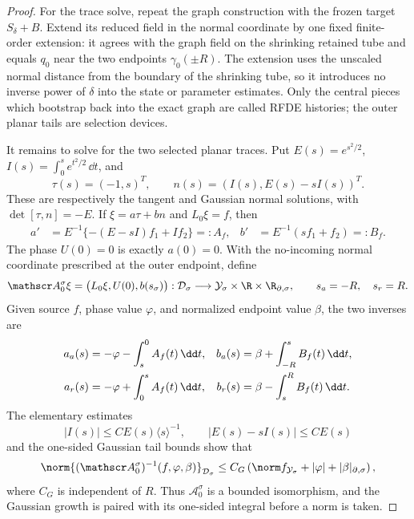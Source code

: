 \begin{proof}
For the trace solve, repeat the graph construction with the frozen target
\(S_\delta+B\).  Extend its reduced field in the normal coordinate by one
fixed finite-order extension: it agrees with the graph field on the
shrinking retained tube and equals \(q_0\) near the two endpoints
\(\gamma_0(\pm R)\).  The extension uses the unscaled normal distance from
the boundary of the shrinking tube, so it introduces no inverse power of
\(\delta\) into the state or parameter estimates.  Only the central pieces
which bootstrap back into the exact graph are called RFDE histories; the
outer planar tails are selection devices.

It remains to solve for the two selected planar traces.  Put \(E(s)=e^{s^2/2}\),
\(I(s)=\int_0^se^{t^2/2}\,\dd t\), and
\[
 \tau(s)=(-1,s)^T,
 \qquad n(s)=(I(s),E(s)-sI(s))^T.
\]
These are respectively the tangent and Gaussian normal solutions, with
\(\det[\tau,n]=-E\).  If \(\xi=a\tau+bn\) and \(L_0\xi=f\), then
\begin{align}
 a'&=E^{-1}\{-(E-sI)f_1+If_2\}=:A_f,&
 b'&=E^{-1}(sf_1+f_2)=:B_f.                           \label{eq:shared-ab}
\end{align}
The phase \(U(0)=0\) is exactly \(a(0)=0\).  With the no-incoming normal
coordinate prescribed at the outer endpoint, define
\begin{equation}
 \mathscr A_0^\sigma\xi
 =\bigl(L_0\xi,U(0),b(s_\sigma)\bigr):
 \mathcal D_\sigma\longrightarrow
 \mathcal Y_\sigma\times\R\times\R_{\partial,\sigma},
 \qquad s_a=-R,\quad s_r=R.                          \label{eq:shared-trace-operator}
\end{equation}
Given source \(f\), phase value \(\varphi\), and normalized endpoint value
\(\beta\), the two inverses are
\begin{align}
 a_a(s)&=-\varphi-\int_s^0A_f(t)\,\dd t,&
 b_a(s)&=\beta+\int_{-R}^sB_f(t)\,\dd t,\notag\\
 a_r(s)&=-\varphi+\int_0^sA_f(t)\,\dd t,&
 b_r(s)&=\beta-\int_s^RB_f(t)\,\dd t.                \label{eq:shared-one-sided-green}
\end{align}
The elementary estimates
\[
 |I(s)|\le CE(s)\langle s\rangle^{-1},
 \qquad |E(s)-sI(s)|\le CE(s)
\]
and the one-sided Gaussian tail bounds show that
\begin{equation}
 \norm{(\mathscr A_0^\sigma)^{-1}(f,\varphi,\beta)}_{\mathcal D_\sigma}
 \le C_G\left(\norm f_{\mathcal Y_\sigma}
                  +|\varphi|+|\beta|_{\partial,\sigma}\right),
                                                               \label{eq:shared-green-bound}
\end{equation}
where \(C_G\) is independent of \(R\).  Thus
\(\mathscr A_0^\sigma\) is a bounded isomorphism, and the Gaussian growth is
paired with its one-sided integral before a norm is taken.


\end{proof}
